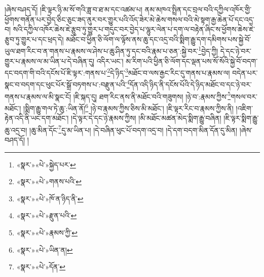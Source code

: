 །ཞེས་བཤད་དོ། །ཇི་ལྟར་ཉི་མ་སོ་གའི་ཟླ་བ་ཐ་མ་དང་འཚམ་པ། ནམ་མཁའ་སྤྲིན་དང་བྲལ་བའི་དཀྱིལ་འཁོར་གྱི་ཕྱོགས་གནོན་པར་བྱེད་ཅིང་ཅུང་ཟད་ནུར་བར་གྱུར་པའི་འོད་ཟེར་མེ་ཆེས་གསལ་བའི་མེ་སྟག་རྒྱ་ཆེན་པོ་དང་འདྲ་བ། སའི་དཀྱིལ་འཁོར་ཆེས་ཇེ་རྩུབ་ཏུ་གྱུར་པ་གདུང་བར་བྱེད་པ་ལྷུར་ལེན་པ་དག་ལ་བརྟེན་ཞིང་ས་ཕྱོགས་ཆེས་ཇེ་རྩུབ་ཏུ་གྱུར་པ་དང་ཕྲད་དེ། མཐོང་བ་ཕྱིན་ཅི་ལོག་ལ་ལྟོས་ནས་ཆུ་དང་འདྲ་བའི་སྨིག་རྒྱུ་དག་དམིགས་པས་སྐྱེ་བོ་ཡུལ་ཐག་རིང་བ་ན་གནས་པ་རྣམས་ལ་ཤེས་པ་ཆུ་ཤིན་ཏུ་དང་བའི་རྣམ་པ་ཅན་:སྐྱེ་བར་\footnote{«སྣར་»«པེ་»སྐྱེད་པར་}བྱེད་ཀྱི། དེ་དང་ཉེ་བར་གྱུར་པ་རྣམས་ལ་མ་ཡིན་པ་དེ་བཞིན་དུ། འདིར་ཡང་། མ་རིག་པའི་ཕྱིན་ཅི་ལོག་དང་ལྡན་པས་སོ་སོའི་སྐྱེ་བོ་བདག་དང་བདག་གི་བའི་དངོས་པོ་ཇི་ལྟར་:གནས་པ་\footnote{«སྣར་»«པེ་»གནས་པའི་}དེ་ཉིད་\footnote{«སྣར་»«པེ་»ཁོ་ན་ཉིད་ནི་}མཐོང་བ་ལས་རྒྱང་རིང་དུ་གནས་པ་རྣམས་ལ། བདེན་པར་སྣང་བ་བདག་དང་ཕུང་པོར་སྒྲོ་བཏགས་པ་:བརྫུན་པའི་\footnote{«སྣར་»«པེ་»རྫུན་པའི་}དོན་འདི་ཉིད་ནི་དངོས་པོའི་དེ་ཉིད་མཐོང་བ་དང་ཉེ་བར་གནས་པ་རྣམས་ལ་མི་སྣང་ངོ། །ཇི་སྐད་དུ། ཐག་རིང་ནས་ནི་མཐོང་བའི་གཟུགས། །ཉེ་བ་:རྣམས་ཀྱིས་\footnote{«སྣར་»«པེ་»རྣམས་ཀྱི་}གསལ་བར་མཐོང་། །སྨིག་རྒྱུ་གལ་ཏེ་ཆུ་:ཡིན་ནོ།\footnote{«སྣར་»«པེ་»ཡིན་ན།} །ཉེ་བ་རྣམས་ཀྱིས་ཅིས་མི་མཐོང་། །ཇི་ལྟར་རིང་བ་རྣམས་ཀྱིས་ནི། །འཇིག་རྟེན་འདི་ནི་ཡང་དག་མཐོང་། །དེ་ལྟར་དེ་དང་ཉེ་རྣམས་ཀྱིས། །མི་མཐོང་མཚན་མེད་སྨིག་རྒྱུ་བཞིན། །ཇི་ལྟར་སྨིག་རྒྱུ་ཆུ་འདྲ་བ། །ཆུ་མིན་དོང་\footnote{«སྣར་»«པེ་»དོན་}དུ་མ་ཡིན་པ། །དེ་བཞིན་ཕུང་པོ་བདག་འདྲ་བ། །དེ་དག་བདག་མིན་དོན་དུ་མིན། །ཞེས་བཤད་དོ། །
